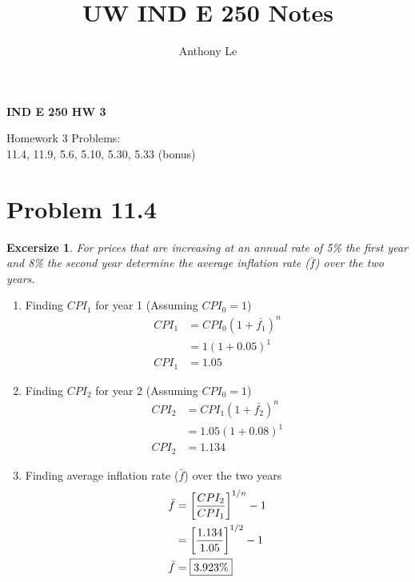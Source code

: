 \documentclass[../INDE250HW.tex]{subfiles}
\title{UW IND E 250 Notes}
\author{Anthony Le}
\newtheorem{exrc}{Excersize}
\begin{document}
\pagestyle{fancy}
\fancyhead{}

\begin{center}
    \LARGE{\textbf{IND E 250 HW 3}}
\end{center}
\begin{center}
    Homework 3 Problems: \\
    11.4, 11.9, 5.6, 5.10, 5.30, 5.33 (bonus)
\end{center}
\section*{Problem 11.4}
\begin{exrc}
   For prices that are increasing at an annual rate of 5\% the first year and 8\% the second year determine the average inflation rate ($\bar{f}$) over the two years.
\end{exrc}
\begin{enumerate}
    \item Finding $CPI_1$ for year 1 (Assuming $CPI_0 = 1$)
        \begin{equation*}
            \begin{aligned}
                CPI_1 &= CPI_0(1 + \bar{f_1})^n \\
                        &= 1(1 + 0.05)^1 \\
                CPI_1 &= 1.05
            \end{aligned}
        \end{equation*}
    \item Finding $CPI_2$ for year 2 (Assuming $CPI_0 = 1$)
        \begin{equation*}
            \begin{aligned}
                CPI_2 &= CPI_1(1 + \bar{f_2})^n \\
                        &= 1.05(1 + 0.08)^1 \\
                CPI_2 &= 1.134
            \end{aligned}
        \end{equation*}
    \item Finding average inflation rate ($\bar{f}$) over the two years
        \begin{equation*}
            \begin{aligned}
                \bar{f} &= \left[\frac{CPI_2}{CPI_1}\right]^{1/n} - 1 \\
                        &= \left[\frac{1.134}{1.05}\right]^{1/2} - 1 \\
                \bar{f} &= \framebox{$3.923\%$}
            \end{aligned}
        \end{equation*}
\end{enumerate}
\end{document}
